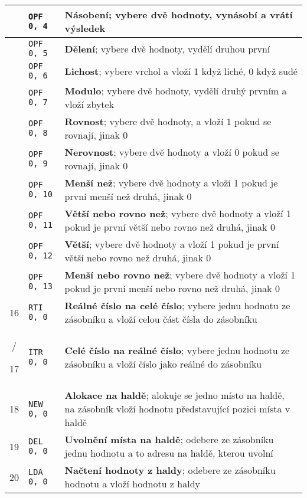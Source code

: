 \documentclass[
12pt,
a4paper,
pdftex,
czech
]{report}
\begin{document}
\begin{table}[]
\begin{longtable}{|c|l|p{10cm}|}
\rule{0pt}{3ex} & \texttt{OPF 0, 4} & \textbf{Násobení}; vybere dvě hodnoty, vynásobí a vrátí výsledek \\ \hline
\rule{0pt}{3ex} & \texttt{OPF 0, 5} & \textbf{Dělení}; vybere dvě hodnoty, vydělí druhou první \\ \hline
\rule{0pt}{3ex} & \texttt{OPF 0, 6} & \textbf{Lichost}; vybere vrchol a vloží 1 když liché, 0 když sudé \\ \hline
\rule{0pt}{3ex} & \texttt{OPF 0, 7} & \textbf{Modulo}; vybere dvě hodnoty, vydělí druhý prvním a vloží zbytek \\ \hline
\rule{0pt}{3ex} & \texttt{OPF 0, 8} & \textbf{Rovnost}; vybere dvě hodnoty, a vloží 1 pokud se rovnají, jinak 0 \\ \hline
\rule{0pt}{3ex} & \texttt{OPF 0, 9} & \textbf{Nerovnost}; vybere dvě hodnoty a vloží 0 pokud se rovnají, jinak 0 \\ \hline
\rule{0pt}{3ex} & \texttt{OPF 0, 10} & \textbf{Menší než}; vybere dvě hodnoty a vloží 1 pokud je první menší než druhá, jinak 0 \\ \hline
\rule{0pt}{3ex} & \texttt{OPF 0, 11} & \textbf{Větší nebo rovno než}; vybere dvě hodnoty a vloží 1 pokud je první větší nebo rovno než druhá, jinak 0 \\ \hline
\rule{0pt}{3ex} & \texttt{OPF 0, 12} & \textbf{Větší}; vybere dvě hodnoty a vloží 1 pokud je první větší nebo rovno než druhá, jinak 0 \\ \hline
\rule{0pt}{3ex} & \texttt{OPF 0, 13} & \textbf{Menší nebo rovno než}; vybere dvě hodnoty a vloží 1 pokud je první menší nebo rovno než druhá, jinak 0 \\ \hline
\rule{0pt}{3ex} 16 & \texttt{RTI 0, 0} & \textbf{Reálné číslo na celé číslo}; vybere jednu hodnotu ze zásobníku a vloží celou část čísla do zásobníku \\ \hline
/\rule{0pt}{3ex} 17 & \texttt{ITR 0, 0} & \textbf{Celé číslo na reálné číslo}; vybere jednu hodnotu ze zásobníku a vloží číslo jako reálné do zásobníku \\ \hline
\rule{0pt}{3ex} 18 & \texttt{NEW 0, 0} &  \textbf{Alokace na haldě}; alokuje se jedno místo na haldě, na zásobník vloží hodnotu představující pozici místa v haldě \\ \hline
\rule{0pt}{3ex} 19 & \texttt{DEL 0, 0} & \textbf{Uvolnění místa na haldě}; odebere ze zásobníku jednu hodnotu a to adresu na haldě, kterou uvolní \\ \hline
\rule{0pt}{3ex} 20 & \texttt{LDA 0, 0} & \textbf{Načtení hodnoty z haldy}; odebere ze zásobníku hodnotu a vloží hodnotu z haldy \\ \hline

\end{longtable}
\end{table}
\end{document}
